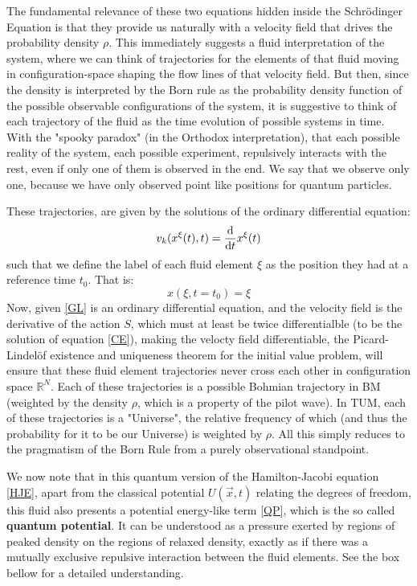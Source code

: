 \documentclass[11pt, a4paper]{article} %
\newcommand{\R}{\mathbb{R}} %
\begin{document}
The fundamental relevance of these two equations hidden inside the Schrödinger Equation is that they provide us naturally with a velocity field that drives the probability density $\rho$. This immediately suggests a fluid interpretation of the system, where we can think of trajectories for the elements of that fluid moving in configuration-space shaping the flow lines of that velocity field. But then, since the density is interpreted by the Born rule as the probability density function of the possible observable configurations of the system, it is suggestive to think of each trajectory of the fluid  as the time evolution of possible systems in time. With the "spooky paradox" (in the Orthodox interpretation), that each possible reality of the system, each possible experiment, repulsively interacts with the rest, even if only one of them is observed in the end. We say that we observe only one, because we have only observed point like positions for quantum particles.

 These trajectories, are given by the solutions of the ordinary differential equation:
\begin{equation}\label{GL}
v_k(x^\xi(t),t)=\dv{}{t}x^\xi(t)
\end{equation}
such that we define the label of each fluid element $\xi$ as the position they had at a reference time $t_0$. That is:
\begin{equation}
x(\xi,t=t_0)=\xi
\end{equation}
Now, given \eqref{GL} is an ordinary differential equation, and the velocity field is the derivative of the action $S$, which must at least be twice differentialble (to be the solution of equation \eqref{CE}), making the velocty field differentiable, the Picard-Lindelöf existence and uniqueness theorem for the initial value problem, will ensure that these fluid element trajectories never cross each other in configuration space $\R^N$. Each of these trajectories is a possible Bohmian trajectory in BM (weighted by the density $\rho$, which is a property of the pilot wave). In TUM, each of these trajectories is a "Universe", the relative frequency of which (and thus the probability for it to be our Universe) is weighted by $\rho$. All this simply reduces to the pragmatism of the Born Rule from a purely observational standpoint.

We now note that in this quantum version of the Hamilton-Jacobi equation \eqref{HJE}, apart from the classical potential $U(\vec{x},t)$ relating the degrees of freedom, this fluid also presents a potential energy-like term \eqref{QP}, which is the so called {\bf quantum potential}. It can be understood as a pressure exerted by regions of peaked density on the regions of relaxed density, exactly as if there was a mutually exclusive repulsive interaction between the fluid elements. See the box bellow for a detailed understanding.
\vspace{+0.3cm}
\end{document}
